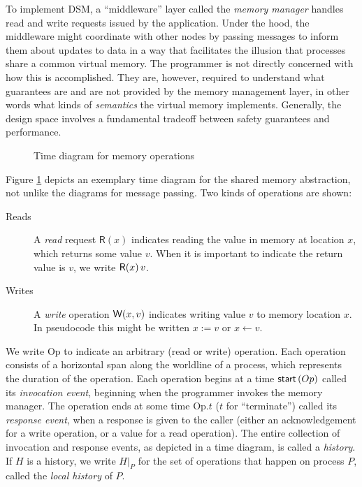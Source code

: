 \documentclass[]             %
{NASA}                       %
\theoremstyle{definition}
\begin{document}
To implement DSM, a ``middleware'' layer called the
\emph{memory manager} handles read and write requests issued by the
application. Under the hood, the middleware might coordinate with
other nodes by passing messages to inform them about updates to data
in a way that facilitates the illusion that processes share a common
virtual memory. The programmer is not directly concerned with how this
is accomplished. They are, however, required to understand what
guarantees are and are not provided by the memory management layer, in
other words what kinds of \emph{semantics} the virtual memory
implements. Generally, the design space involves a fundamental
tradeoff between safety guarantees and performance.

\begin{figure}
    \centering
    
    \caption{Time diagram for memory operations}
    \label{fig:smEx1}
\end{figure}

\newcommand{\Op}{\mathrm{Op}}

Figure \ref{fig:smEx1} depicts an exemplary time diagram for the
shared memory abstraction, not unlike the diagrams for message
passing. Two kinds of operations are shown:
\begin{description}
\item[Reads] A \emph{read} request $\mathsf{R}(x)$ indicates reading the value
  in memory at location $x$, which returns some value $v$. When it is
  important to indicate the return value is $v$, we write $\mathsf{R}\!\left(x\right){v}$.
\item[Writes] A \emph{write} operation $\mathsf{W}\!\left(x, v\right)$ indicates writing
  value $v$ to memory location $x$. In pseudocode this might be written
  $x := v$ or $x \leftarrow v$.
\end{description}
We write $\Op$ to indicate an arbitrary (read or write)
operation. Each operation consists of a horizontal span along the
worldline of a process, which represents the duration of the
operation. Each operation begins at a time $\mathsf{start}\left(Op\right)$
called its \emph{invocation event}, beginning when the programmer
invokes the memory manager. The operation ends at some time $\Op.t$
($t$ for ``terminate'') called its \emph{response event}, when a
response is given to the caller (either an acknowledgement for a write
operation, or a value for a read operation). The entire collection of
invocation and response events, as depicted in a time diagram, is
called a \emph{history}. If $H$ is a history, we write $H|_P$ for the
set of operations that happen on process $P$, called the \emph{local
  history} of $P$.
\end{document}
